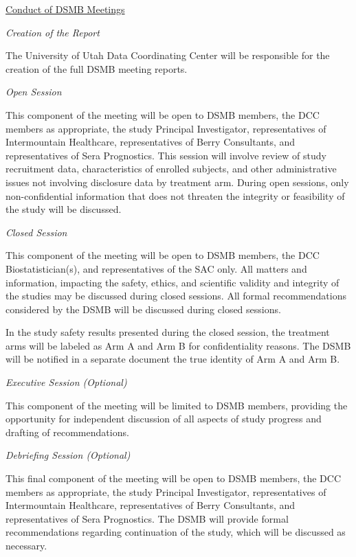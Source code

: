 \documentclass[12pt]{article}
\begin{document}
\vspace{0.4cm}
\noindent \underline{Conduct of DSMB Meetings}

\vspace{0.2cm}
\noindent \textit{Creation of the Report}

The University of Utah Data Coordinating Center will be responsible for the 
creation of the full DSMB meeting reports.

\vspace{0.4cm}
\noindent \textit{Open Session} 

This component of the meeting will be open to DSMB members, the DCC members 
as appropriate, the study Principal Investigator, representatives of 
Intermountain Healthcare, representatives of Berry Consultants, and 
representatives of Sera Prognostics. This session will involve review of 
study recruitment data, characteristics of enrolled subjects, and other 
administrative issues not involving disclosure data by treatment arm. During 
open sessions, only non-confidential information that does not threaten the 
integrity or feasibility of the study will be discussed.

\vspace{0.4cm}
\noindent \textit{Closed Session}

This component of the meeting will be open to DSMB members, the DCC 
Biostatistician(s), and representatives of the SAC only. All matters and 
information, impacting the safety, ethics, and scientific validity and 
integrity of the studies may be discussed during closed sessions. All formal 
recommendations considered by the DSMB will be discussed during closed 
sessions.

In the study safety results presented during the closed session, the 
treatment arms will be labeled as Arm A and Arm B for confidentiality 
reasons. The DSMB will be notified in a separate document the true identity 
of Arm A and Arm B.

\vspace{0.4cm}
\noindent \textit{Executive Session (Optional)}

This component of the meeting will be limited to DSMB members, providing the 
opportunity for independent discussion of all aspects of study progress and 
drafting of recommendations. 

\vspace{0.4cm}
\noindent \textit{Debriefing Session (Optional)}

This final component of the meeting will be open to DSMB members, the DCC 
members as appropriate, the study Principal Investigator, representatives of 
Intermountain Healthcare, representatives of Berry Consultants, and 
representatives of Sera Prognostics. The DSMB will provide formal 
recommendations regarding continuation of the study, which will be discussed 
as necessary. 
\end{document}
